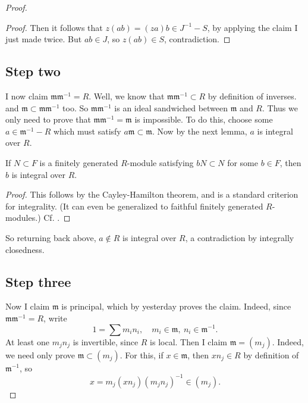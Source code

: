\begin{proof}
\begin{proof}
Then it follows that $z(ab) = (za) b \in J^{-1} - S$, by applying the claim I just made twice.  But $ab \in J$, so $z(ab) \in S$, contradiction.
\end{proof}



\subsection{Step two}

I now claim $\mathfrak{m}\mathfrak{m}^{-1} = R$.  Well, we know that $\mathfrak{m}\mathfrak{m}^{-1} \subset R$ by definition of inverses. and $\mathfrak{m} \subset \mathfrak{m}\mathfrak{m}^{-1}$ too.  So $\mathfrak{m}\mathfrak{m}^{-1}$ is an ideal sandwiched between $\mathfrak{m}$ and $R$.  
Thus we only need to prove that $\mathfrak{m} \mathfrak{m}^{-1} = \mathfrak{m}$ is impossible.  To do this, choose some $a \in \mathfrak{m}^{-1} - R$ which must satisfy $a \mathfrak{m} \subset \mathfrak{m}$.  Now by the next lemma, $a$ is integral over $R$.

\begin{lemma} If $N \subset F$ is a finitely generated $R$-module satisfying $b  N \subset N$ for some $b \in F$, then $b$ is integral over $R$.
\end{lemma}
\begin{proof}

This follows by the Cayley-Hamilton theorem, and is a standard criterion for
integrality.  (It can even be generalized to faithful finitely generated
$R$-modules.)  Cf. \cite{La02}.
\end{proof}

So returning back above, $a \notin R$ is integral over $R$, a contradiction by integrally closedness.

\subsection{Step three}

Now I claim $\mathfrak{m}$ is principal, which by yesterday proves the claim.  Indeed, since $\mathfrak{m} \mathfrak{m}^{-1} = R$, write
\[ 1 = \sum m_i n_i, \quad m_i \in \mathfrak{m}, \ n_i \in \mathfrak{m}^{-1}.\]
At least one $m_j n_j$ is invertible, since $R$ is local.  Then I claim $\mathfrak{m} = (m_j)$.  Indeed, we need only prove $\mathfrak{m} \subset (m_j)$.  For this, if $x \in \mathfrak{m}$, then $xn_j \in R$ by definition of $\mathfrak{m}^{-1}$, so  \[ x = m_j (xn_j) (m_jn_j)^{-1} \in ( m_j).\]
\end{proof}

